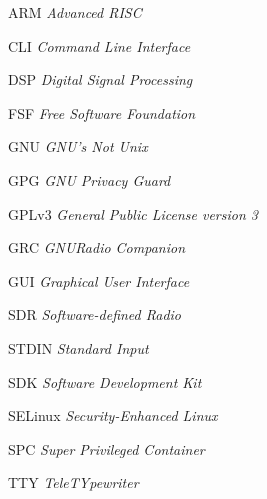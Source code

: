 \documentclass[
  12pt,				%
  openright,			%
  twoside,			%
  a4paper,			%
  english,			%
  french,				%
  spanish,			%
  brazil,				%
  ]{abntex2}
\begin{document}
\listoffigures*
\cleardoublepage

\listoftables*
\cleardoublepage

\begin{siglas}


  \item[ARM]  \textit{Advanced RISC}
  \item[CLI]  \textit{Command Line Interface}
  \item[DSP]  \textit{Digital Signal Processing}
  \item[FSF]  \textit{Free Software Foundation}
  \item[GNU]  \textit{GNU's Not Unix}
  \item[GPG]  \textit{GNU Privacy Guard}
  \item[GPLv3]  \textit{General Public License version 3}
  \item[GRC]  \textit{GNURadio Companion}
  \item[GUI]  \textit{Graphical User Interface}
  \item[SDR]  \textit{Software-defined Radio}
  \item[STDIN]  \textit{Standard Input}
  \item[SDK]  \textit{Software Development Kit}
  \item[SELinux]  \textit{Security-Enhanced Linux}
  \item[SPC]  \textit{Super Privileged Container}
  \item[TTY]  \textit{TeleTYpewriter}


\end{siglas}
\end{document}

